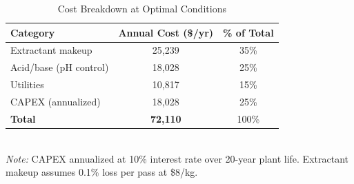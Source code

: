 \begin{table}[htbp]
\centering
\caption{Cost Breakdown at Optimal Conditions}
\label{tab:cost-breakdown}
\begin{tabular}{lcc}
\toprule
Category & Annual Cost (\$/yr) & \% of Total \\
\midrule
Extractant makeup & 25,239 & 35\% \\
Acid/base (pH control) & 18,028 & 25\% \\
Utilities & 10,817 & 15\% \\
CAPEX (annualized) & 18,028 & 25\% \\
\textbf{Total} & \textbf{72,110} & 100\% \\
\bottomrule
\end{tabular}
\\[0.5em]
\footnotesize{\textit{Note:} CAPEX annualized at 10\% interest rate over 20-year plant life. Extractant makeup assumes 0.1\% loss per pass at \$8/kg.}
\end{table}